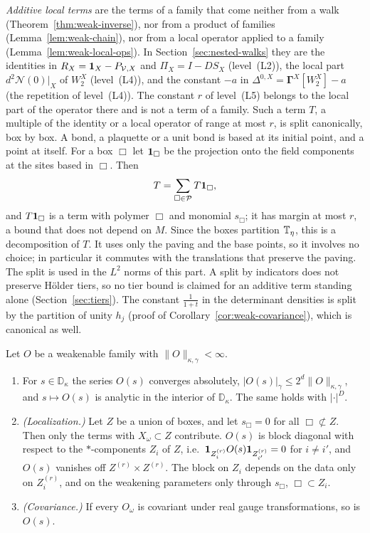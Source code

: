 \emph{Additive local terms} are the terms of a family that come neither from a walk (Theorem~\ref{thm:weak-inverse}), nor from a product of families (Lemma~\ref{lem:weak-chain}), nor from a local operator applied to a family (Lemma~\ref{lem:weak-local-ops}). In Section~\ref{sec:nested-walks} they are the identities in $R_X=\mathbf 1_X-P_{\mathcal V,X}$ and $\Pi_X=I-DS_X$ (level~(L2)), the local part $d^2\mathcal N(0)|_X$ of $W_2^X$ (level~(L4)), and the constant $-a$ in $\Delta^{0,X}=\boldsymbol\Gamma^X[W_2^X]-a$ (the repetition of level~(L4)). The constant $r$ of level~(L5) belongs to the local part of the operator there and is not a term of a family. Such a term $T$, a multiple of the identity or a local operator of range at most $r$, is split canonically, box by box. A bond, a plaquette or a unit bond is based at its initial point, and a point at itself. For a box $\Box$ let $\mathbf 1_\Box$ be the projection onto the field components at the sites based in $\Box$. Then
\[
T=\sum_{\Box\in\mathcal P}T\mathbf 1_\Box ,
\]
and $T\mathbf 1_\Box$ is a term with polymer $\Box$ and monomial $s_\Box$; it has margin at most $r$, a bound that does not depend on $M$. Since the boxes partition $\mathbb T_\eta$, this is a decomposition of $T$. It uses only the paving and the base points, so it involves no choice; in particular it commutes with the translations that preserve the paving. The split is used in the $L^2$ norms of this part. A split by indicators does not preserve H\"older tiers, so no tier bound is claimed for an additive term standing alone (Section~\ref{sec:tiers}). The constant $\frac1{1+t}$ in the determinant densities is split by the partition of unity $h_j$ (proof of Corollary~\ref{cor:weak-covariance}), which is canonical as well.

\begin{lemma}\label{lem:weak-basic}
Let $O$ be a weakenable family with $\|O\|_{\kappa,\gamma}<\infty$.
\begin{enumerate}[label=(\alph*)]
\item For $s\in\mathbb D_\kappa$ the series $O(s)$ converges absolutely, $|O(s)|_\gamma\le2^d\|O\|_{\kappa,\gamma}$, and $s\mapsto O(s)$ is analytic in the interior of $\mathbb D_\kappa$. The same holds with $|\cdot|^D$.
\item \emph{(Localization.)} Let $Z$ be a union of boxes, and let $s_\Box=0$ for all $\Box\not\subset Z$. Then only the terms with $X_\omega\subset Z$ contribute. $O(s)$ is block diagonal with respect to the $*$-components $Z_i$ of $Z$, i.e.\ $\mathbf 1_{Z_i^{(r)}}O(s)\mathbf 1_{Z_{i'}^{(r)}}=0$ for $i\ne i'$, and $O(s)$ vanishes off $Z^{(r)}\times Z^{(r)}$. The block on $Z_i$ depends on the data only on $Z_i^{(r)}$, and on the weakening parameters only through $s_\Box$, $\Box\subset Z_i$.
\item \emph{(Covariance.)} If every $O_\omega$ is covariant under real gauge transformations, so is $O(s)$.
\end{enumerate}
\end{lemma}

